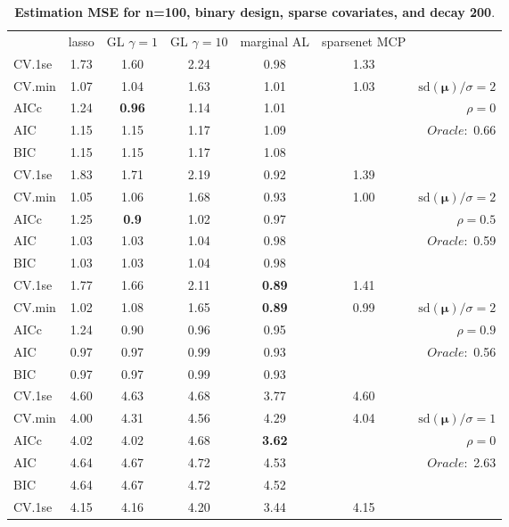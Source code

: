 \clearpage
\begin{table}\vspace{-.5cm}
\caption[l]{ { \bf Estimation MSE for n=100, binary design, 
sparse covariates, and  decay  200}.}
\vspace{-.5cm}
\footnotesize{}
\begin{center}
\begin{tabular}{l*{5}{c}|r}
& lasso & GL $\gamma=1$ & GL $\gamma=10$ & marginal AL & sparsenet MCP  & \\
 \cline{1-7}
CV.1se & 1.73 & 1.60 & 2.24 & 0.98 & 1.33 & \\
CV.min & 1.07 & 1.04 & 1.63 & 1.01 & 1.03 &  $\mathrm{sd}(\mathbf{\mu})/\sigma=2$ \\
AICc & 1.24 & {\bf 0.96} & 1.14 & 1.01 & & $\rho=0$ \\
AIC & 1.15 & 1.15 & 1.17 & 1.09 & &  \multirow{2}{*}{$Oracle: $ 0.66} \\
BIC & 1.15 & 1.15 & 1.17 & 1.08 & &  \\
 \hline 
CV.1se & 1.83 & 1.71 & 2.19 & 0.92 & 1.39 & \\
CV.min & 1.05 & 1.06 & 1.68 & 0.93 & 1.00 &  $\mathrm{sd}(\mathbf{\mu})/\sigma=2$ \\
AICc & 1.25 & {\bf 0.9} & 1.02 & 0.97 & & $\rho=0.5$ \\
AIC & 1.03 & 1.03 & 1.04 & 0.98 & &  \multirow{2}{*}{$Oracle: $ 0.59} \\
BIC & 1.03 & 1.03 & 1.04 & 0.98 & &  \\
 \hline 
CV.1se & 1.77 & 1.66 & 2.11 & {\bf 0.89} & 1.41 & \\
CV.min & 1.02 & 1.08 & 1.65 & {\bf 0.89} & 0.99 &  $\mathrm{sd}(\mathbf{\mu})/\sigma=2$ \\
AICc & 1.24 & 0.90 & 0.96 & 0.95 & & $\rho=0.9$ \\
AIC & 0.97 & 0.97 & 0.99 & 0.93 & &  \multirow{2}{*}{$Oracle: $ 0.56} \\
BIC & 0.97 & 0.97 & 0.99 & 0.93 & &  \\
 \hline 
CV.1se & 4.60 & 4.63 & 4.68 & 3.77 & 4.60 & \\
CV.min & 4.00 & 4.31 & 4.56 & 4.29 & 4.04 &  $\mathrm{sd}(\mathbf{\mu})/\sigma=1$ \\
AICc & 4.02 & 4.02 & 4.68 & {\bf 3.62} & & $\rho=0$ \\
AIC & 4.64 & 4.67 & 4.72 & 4.53 & &  \multirow{2}{*}{$Oracle: $ 2.63} \\
BIC & 4.64 & 4.67 & 4.72 & 4.52 & &  \\
 \hline 
CV.1se & 4.15 & 4.16 & 4.20 & 3.44 & 4.15 & \\

\end{tabular}
\end{center}
\end{table}
